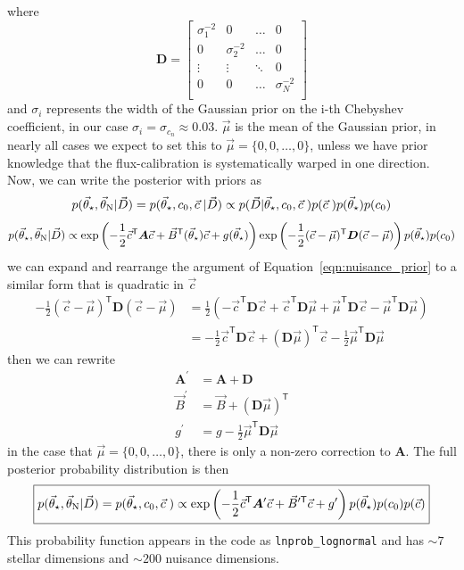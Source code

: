 \documentclass[preprint]{aastex} %
\newcommand{\vt}{\vec{\theta}}
\newcommand{\vstar}{\vt_{\star}}
\newcommand{\vN}{\vt_{\rm N}}
\newcommand{\vc}{\vec{c}}
\newcommand{\vD}{\vec{D}}
\newcommand{\trans}{\mathsf{T}}
\begin{document}
where 
\begin{equation}
  {\bm D} = 
  \begin{bmatrix}
    \sigma_1^{-2} & 0 & \hdots & 0 \\
    0 & \sigma_2^{-2} & \hdots & 0 \\
    \vdots & \vdots & \ddots & 0 \\
    0 & 0 & \hdots & \sigma_N^{-2} \\
  \end{bmatrix}
\end{equation}
and $\sigma_i$ represents the width of the Gaussian prior on the i-th Chebyshev coefficient, in our case $\sigma_i = \sigma_{c_n} \approx 0.03$. $\vec{\mu}$ is the mean of the Gaussian prior, in nearly all cases we expect to set this to $\vec{\mu} = \{0, 0, \ldots, 0\}$, unless we have prior knowledge that the flux-calibration is systematically warped in one direction. Now, we can write the posterior with priors as
\begin{equation}
  p(\vstar, \vN | \vD) = p(\vstar, c_0, \vc\; | \vD) \propto p( \vD | \vstar, c_0, \vc\; ) p(\vc\;) p(\vstar) p(c_0) 
\end{equation}
\begin{equation}
  p(\vstar, \vN | \vD) \propto \exp \left ( - \frac{1}{2} \vc^\trans {\bm A} \vc + \vec{B}^\trans(\vstar) \vc + g(\vstar) \right )  \exp \left ( -\frac{1}{2} (\vc - \vec{\mu})^\trans {\bm D} (\vc - \vec{\mu}) \right ) p(\vstar) p(c_0)
  \label{eqn:posterior_prior}
\end{equation}
we can expand and rearrange the argument of Equation~\ref{eqn:nuisance_prior} to a similar form that is quadratic in $\vc$
\begin{align}
  -\frac{1}{2} (\vc - \vec{\mu})^\trans {\bm D} (\vc - \vec{\mu}) &= \frac{1}{2}\left ( -\vc^\trans {\bm D} \vc + \vc^\trans {\bm D} \vec{\mu} + \vec{\mu}^\trans {\bm D} \vc - \vec{\mu}^\trans {\bm D} \vec{\mu} \right )\\
  &= -\frac{1}{2} \vc^\trans {\bm D} \vc + ({\bm D} \vec{\mu})^\trans \vc - \frac{1}{2} \vec{\mu}^\trans {\bm D} \vec{\mu}
\end{align}
then we can rewrite
\begin{align}
  {\bm A}^\prime &= {\bm A} + {\bm D}\\
  \vec{B}^\prime &= \vec{B} + ({\bm D} \vec{\mu})^\trans\\
  g^\prime &= g - \frac{1}{2} \vec{\mu}^\trans {\bm D} \vec{\mu} 
\end{align}
in the case that $\vec{\mu} = \{0, 0, \ldots, 0\}$, there is only a non-zero correction to ${\bm A}$. The full posterior probability distribution is then
 \begin{equation}
   \boxed{
  p(\vstar, \vN | \vD) = p(\vstar, c_0, \vc\;) \propto \exp \left ( - \frac{1}{2} \vc^\trans {\bm A}^\prime \vc + \vec{B}^{\prime \trans} \vc + g^\prime \right ) p(\vstar) p(c_0) p(\vc)
}
\label{eqn:lnprob_lognormal}
\end{equation}
This probability function appears in the code as \texttt{lnprob\_lognormal} and has $\sim 7$ stellar dimensions and $\sim 200$ nuisance dimensions.
\end{document}
